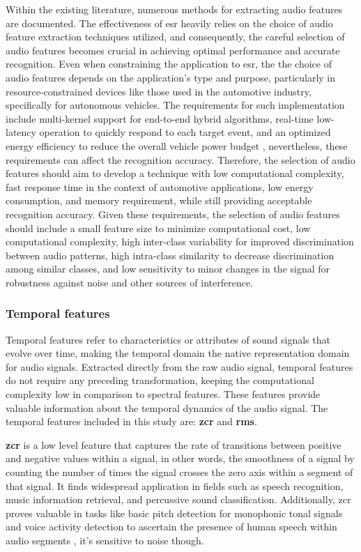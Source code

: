 Within the existing literature, numerous methods for extracting audio features are documented. The effectiveness of \gls{esr} heavily relies on the choice of audio feature extraction techniques utilized, and consequently, the careful selection of audio features becomes crucial in achieving optimal performance and accurate recognition. Even when constraining the application to \gls{esr}, the the choice of audio features depends on the application’s type and purpose, particularly in resource-constrained devices like those used in the automotive industry, specifically for autonomous vehicles. The requirements for such implementation include multi-kernel support for end-to-end hybrid algorithms, real-time low-latency operation to quickly respond to each target event, and an optimized energy efficiency to reduce the overall vehicle power budget \cite{Yin2023}, nevertheless, these requirements can affect the recognition accuracy. Therefore, the selection of audio features should aim to develop a technique with low computational complexity, fast response time in the context of automotive applications, low energy consumption, and memory requirement, while still providing acceptable recognition accuracy. Given these requirements, the selection of audio features should include a small feature size to minimize computational cost, low computational complexity, high inter-class variability for improved discrimination between audio patterns, high intra-class similarity to decrease discrimination among similar classes, and low sensitivity to minor changes in the signal for robustness against noise and other sources of interference.


\subsubsection{Temporal features}
\label{subsubsec:audio_features_temporal}

Temporal features refer to characteristics or attributes of sound signals that evolve over time, making the temporal domain the native representation domain for audio signals. Extracted directly from the raw audio signal, temporal features do not require any preceding transformation, keeping the computational complexity low in comparison to spectral features. These features provide valuable information about the temporal dynamics of the audio signal. The temporal features included in this study are: \textbf{\gls{zcr}} and \textbf{\gls{rms}}.

\textbf{\gls{zcr}} is a low level feature that captures the rate of transitions between positive and negative values within a signal, in other words,  the smoothness of a signal by counting the number of times the signal crosses the zero axis within a segment of that signal. It finds widespread application in fields such as speech recognition, music information retrieval, and percussive sound classification. Additionally, \gls{zcr} proves valuable in tasks like basic pitch detection for monophonic tonal signals and voice activity detection to ascertain the presence of human speech within audio segments \cite{Park2008}, it's sensitive to noise though. 

